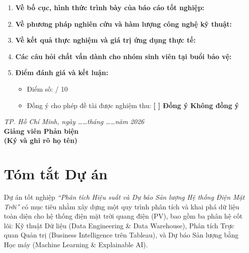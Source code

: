 \documentclass[12pt, a4paper]{report}
\begin{document}
\begin{enumerate}[label=\textbf{\arabic*.}, leftmargin=*]
    \item \textbf{Về bố cục, hình thức trình bày của báo cáo tốt nghiệp:}
    \vspace{0.8cm}
    \dotfill
    \vspace{0.8cm}
    \dotfill
    
    \item \textbf{Về phương pháp nghiên cứu và hàm lượng công nghệ kỹ thuật:}
    \vspace{0.8cm}
    \dotfill
    \vspace{0.8cm}
    \dotfill
    
    \item \textbf{Về kết quả thực nghiệm và giá trị ứng dụng thực tế:}
    \vspace{0.8cm}
    \dotfill
    \vspace{0.8cm}
    \dotfill
    
    \item \textbf{Các câu hỏi chất vấn dành cho nhóm sinh viên tại buổi bảo vệ:}
    \vspace{0.8cm}
    \dotfill
    \vspace{0.8cm}
    \dotfill
    
    \item \textbf{Điểm đánh giá và kết luận:}
    \begin{itemize}[noitemsep]
        \item Điểm số: \dotfill / 10
        \item Đồng ý cho phép đề tài được nghiệm thu: \textbf{[  ] Đồng ý \quad [  ] Không đồng ý}
    \end{itemize}
\end{enumerate}

\vspace{1cm}
\begin{flushright}
    \textit{TP. Hồ Chí Minh, ngày \dots\dots tháng \dots\dots năm 2026} \\[5pt]
    \textbf{Giảng viên Phản biện} \\[40pt]
    \textbf{(Ký và ghi rõ họ tên)}
\end{flushright}


\chapter*{Tóm tắt Dự án}

Dự án tốt nghiệp \textit{``Phân tích Hiệu suất và Dự báo Sản lượng Hệ thống Điện Mặt Trời''} có mục tiêu nhằm xây dựng một quy trình phân tích và khai phá dữ liệu toàn diện cho hệ thống điện mặt trời quang điện (PV), bao gồm ba phân hệ cốt lõi: Kỹ thuật Dữ liệu (Data Engineering \& Data Warehouse), Phân tích Trực quan Quản trị (Business Intelligence trên Tableau), và Dự báo Sản lượng bằng Học máy (Machine Learning \& Explainable AI).
\end{document}
